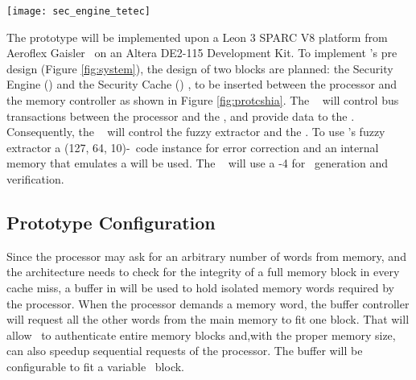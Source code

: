 

   \begin{figure*}[!htb]
	  \centering
	  \texttt{[image: sec\_engine\_tetec]}
	  \caption{The prototype architecture.}
	  \label{fig:protcshia}
  \end{figure*}

   The prototype will be implemented upon a Leon 3 SPARC V8 platform from Aeroflex Gaisler~\cite{Leon} on an Altera DE2-115 Development Kit. To implement \cshia's pre design (Figure \ref{fig:system}), the design of two blocks are planned: the Security Engine (\tagsystem) and the Security Cache (\seccache) , to be inserted between the processor and the memory controller as shown in Figure \ref{fig:protcshia}. The \seccache~ will control bus transactions between the processor and the \mctrl, and provide data to the \tagsystem. Consequently, the \tagsystem~ will control the fuzzy extractor and the \ptaggen. To use  \cshia's fuzzy extractor a (127, 64, 10)-\bch~code instance for error correction and  an internal memory that emulates a \spuf will be used. The \ptaggen~ will use a -4 for \ptag~generation and verification.



  \subsection{Prototype Configuration}
  \label{subsec:cshia-configuration}

  
  Since the processor may ask for an arbitrary number of words from memory, and the architecture needs to check for the integrity of a full memory block in every cache miss, a buffer in \seccache will be used to hold isolated memory words required by the processor. When the processor demands a memory word, the buffer controller will request all the other words from the main memory to fit one \ptag block. That will allow \cshia~to authenticate entire memory blocks and,with the proper memory size, can also speedup sequential requests of the processor. The buffer will be configurable to fit a variable \ptag~block. 
 
 
